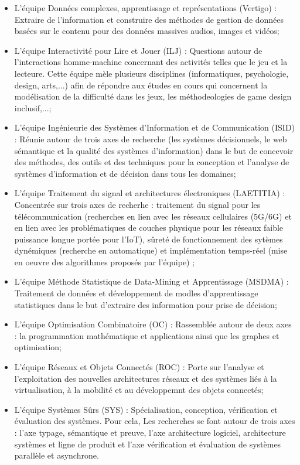 \documentclass{article}
\begin{document}
		\begin{itemize}
			\item L'équipe Données complexes, apprentissage et représentations (Vertigo) : Extraire de l'information et construire des méthodes de gestion de données basées sur le contenu pour des données massives audios, images et vidéos;
			\item L'équipe Interactivité pour Lire et Jouer (ILJ) : Questions autour de l'interactions homme-machine concernant des activités telles que le jeu et la lecteure. Cette équipe mèle plusieurs disciplines (informatiques, psychologie, design, arts,...) afin de répondre aux études en cours qui concernent la modélisation de la difficulté dans les jeux, les méthodeologies de game design inclusif,...;
			\item L'équipe Ingénieurie des Systèmes d'Information et de Communication (ISID) : Réunie autour de trois axes de recherche (les systèmes décisionnels, le web sémantique et la qualité des systèmes d'information) dans le but de concevoir des méthodes, des outils et des techniques	pour la conception et l'analyse de systèmes d'information et de décision dans tous les domaines;
			\item L'équipe Traitement du signal et architectures électroniques (LAETITIA) : Concentrée sur trois axes de recherhe : traitement du signal pour les télécommunication (recherches en lien avec les réseaux cellulaires (5G/6G) et en lien avec les problématiques de couches physique pour les réseaux faible puissance longue portée pour l'IoT), sûreté de fonctionnement des sytèmes dynémiques (recherche en automatique) et implémentation temps-réel (mise en oeuvre des algorithmes proposés par l'équipe) ;
			\item L'équipe Méthode Statistique de Data-Mining et Apprentissage (MSDMA) : Traitement de données et développement de modles d'apprentissage statistiques dans le but d'extraire des information pour prise de décision;
			\item L'équipe Optimisation Combinatoire (OC) : Rassemblée autour de deux axes : la programmation mathématique et applications ainsi que les graphes et optimisation;
			\item L'équipe Réseaux et Objets Connectés (ROC) : Porte sur l'analyse et l'exploitation des nouvelles architectures réseaux et des systèmes liés à la virtualisation, à la mobilité et au développemnt des objets connectés;
			\item L'équipe Systèmes Sûrs (SYS) : Spécialisation, conception, vérification et évaluation des systèmes. Pour cela, Les recherches se font autour de trois axes : l'axe typage, sémantique et preuve, l'axe architecture logiciel, architecture systèmes et ligne de produit et l'axe vérification  et évaluation de systèmes parallèle et asynchrone.
		\end{itemize}
\end{document}
